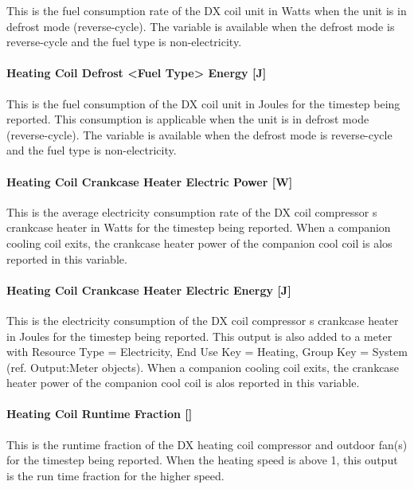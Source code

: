 This is the fuel consumption rate of the DX coil unit in Watts when the unit is in defrost mode (reverse-cycle). The variable is available when the defrost mode is reverse-cycle and the fuel type is non-electricity.

\paragraph{Heating Coil Defrost \textless{}Fuel Type\textgreater{} Energy {[}J{]}}\label{heating-coil-defrost-fuel-type-energy-j}

This is the fuel consumption of the DX coil unit in Joules for the timestep being reported. This consumption is applicable when the unit is in defrost mode (reverse-cycle). The variable is available when the defrost mode is reverse-cycle and the fuel type is non-electricity.

\paragraph{Heating Coil Crankcase Heater Electric Power {[}W{]}}\label{heating-coil-crankcase-heater-electric-power-w-1}

This is the average electricity consumption rate of the DX coil compressor s crankcase heater in Watts for the timestep being reported. When a companion cooling coil exits, the crankcase heater power of the companion cool coil is alos reported in this variable.

\paragraph{Heating Coil Crankcase Heater Electric Energy {[}J{]}}\label{heating-coil-crankcase-heater-electric-energy-j-1}

This is the electricity consumption of the DX coil compressor s crankcase heater in Joules for the timestep being reported. This output is also added to a meter with Resource Type = Electricity, End Use Key = Heating, Group Key = System (ref. Output:Meter objects). When a companion cooling coil exits, the crankcase heater power of the companion cool coil is alos reported in this variable.

\paragraph{Heating Coil Runtime Fraction {[]}}\label{heating-coil-runtime-fraction-5}

This is the runtime fraction of the DX heating coil compressor and outdoor fan(s) for the timestep being reported. When the heating speed is above 1, this output is the run time fraction for the higher speed.

